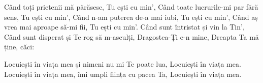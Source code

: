 \beginverse
Când toți prietenii mă părăsesc, Tu ești cu min',
Când toate lucrurile-mi par fără sens, Tu ești cu min',
Când n-am puterea de-a mai iubi, Tu ești cu min',
Când aș vrea mai aproape să-mi fii, Tu ești cu min'.
Când sunt întristat și vin la Tin',
Când sunt disperat și Te rog să m-asculți,
Dragostea-Ți e-n mine, Dreapta Ta mă ține, căci:
\endverse

\beginchorus
Locuiești în viața mea și nimeni nu mi Te poate lua,
Locuiești în viața mea.
Locuiești în viața mea, îmi umpli ființa cu pacea Ta,
Locuiești în viața mea.
\endchorus
\endsong